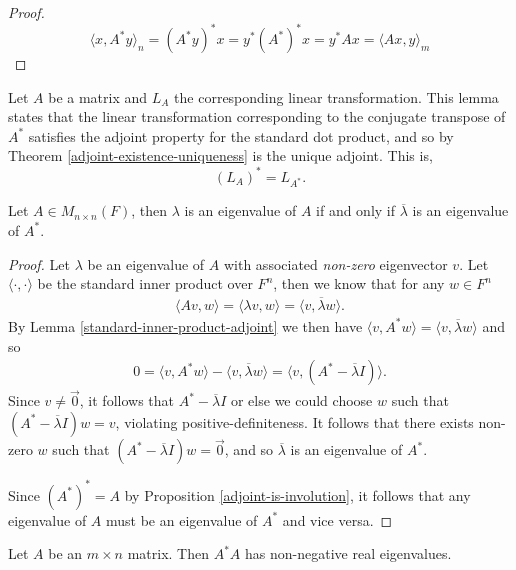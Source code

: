 \begin{proof}
    \[\langle x, A^{*}y\rangle_n = (A^{*}y)^{*}x = y^{*}(A^*)^{*}x = y^*Ax = \langle Ax, y \rangle_m\]
\end{proof}

\begin{rmk}
    Let $A$ be a matrix and $L_A$ the corresponding linear transformation. This lemma states that the linear transformation corresponding to the conjugate transpose of $A^{*}$ satisfies the adjoint property for the standard dot product, and so by Theorem \ref{adjoint-existence-uniqueness} is the unique adjoint. This is,
    \[\left(L_A\right)^{*} = L_{A^{*}}.\]
\end{rmk}

\begin{prop}\label{adjoint-eigenvalues}
    Let $A \in M_{n \times n}(F)$, then $\lambda$ is an eigenvalue of $A$ if and only if $\overline{\lambda}$ is an eigenvalue of $A^{*}$.
\end{prop}

\begin{proof}
    Let $\lambda$ be an eigenvalue of $A$ with associated \emph{non-zero} eigenvector $v$. Let $\langle\cdot,\cdot\rangle$ be the standard inner product over $F^n$, then we know that for any $w \in F^n$
    \begin{align*}
        \langle Av, w\rangle = \langle \lambda v, w\rangle = \langle v, \overline{\lambda}w\rangle.
    \end{align*}
    By Lemma \ref{standard-inner-product-adjoint} we then have $\langle v, A^{*}w \rangle = \langle v, \overline{\lambda}w\rangle$ and so
    \begin{align*}
        0 = \langle v, A^{*}w \rangle - \langle v, \overline{\lambda}w\rangle = \langle v, \left(A^{*} - \overline{\lambda}I\right)\rangle.
    \end{align*}
    Since $v \neq \vec{0}$, it follows that $A^{*} - \overline{\lambda}I$ or else we could choose $w$ such that $\left(A^{*} - \overline{\lambda}I\right)w = v$, violating positive-definiteness. It follows that there exists non-zero $w$ such that $\left(A^{*} - \overline{\lambda}I\right)w = \vec{0}$, and so $\overline{\lambda}$ is an eigenvalue of $A^{*}$.

    Since $\left(A^*\right)^* = A$ by Proposition \ref{adjoint-is-involution}, it follows that any eigenvalue of $A$ must be an eigenvalue of $A^*$ and vice versa.
\end{proof}

\begin{prop}\label{astara-eigenvalues-positive-real}
    Let $A$ be an $m \times n$ matrix. Then $A^{*}A$ has non-negative real eigenvalues.
\end{prop}

